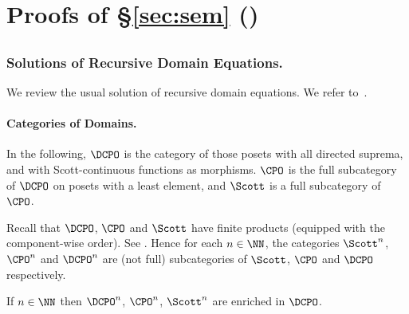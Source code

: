 \section{Proofs of \S\ref{sec:sem} ()}
\label{sec:proof:sem}

\subsection{}
\label{sec:proof:sem:pure}


\subsubsection{Solutions of Recursive Domain Equations.}
We review the usual solution of recursive domain equations.
We refer to~\cite{ac98book,aj95chapter,streicher06book}.


\paragraph{Categories of Domains.}
In the following, $\DCPO$ is the category of those
posets with all directed suprema, and with Scott-continuous
functions as morphisms.
$\CPO$ is the full subcategory of $\DCPO$
on posets with a least element,
and $\Scott$ is a full subcategory of $\CPO$.


Recall that $\DCPO$, $\CPO$ and $\Scott$
have finite products
(equipped with the component-wise order).
See \cite[Theorem 3.3.3, Theorem 3.3.5 and Corollary 4.1.6]{aj95chapter}.
Hence for each $n \in \NN$, the categories
$\Scott^n$, $\CPO^n$ and $\DCPO^n$
are (not full) subcategories of $\Scott$, $\CPO$ and $\DCPO$
respectively.

\begin{lemma}
\label{lem:proof:scott:enrich}
If $n \in \NN$ then
$\DCPO^n$,
$\CPO^n$, $\Scott^n$ are enriched in $\DCPO$.
\end{lemma}

